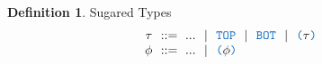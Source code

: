 \documentclass[acmsmall]{acmart}
\theoremstyle{definition}
\newtheorem{definition}{Definition}[section]
\begin{document}
\begin{definition} Sugared Types 
  \label{definition:sugared_types}
  \[\begin{array}[t]{r@{}l}
    \nonterm{\tau} & \is 
    \begin{array}[t]{@{}l}
      ... \sep
      \obj{TOP} \sep 
      \obj{BOT} \sep
      \obj{(}\tau\obj{)}

    \end{array}
    \\
    \nonterm{\phi} & \is 
    \begin{array}[t]{@{}l}
      ... \sep
      \obj{(}\phi\obj{)}

    \end{array}
  \end{array}\]
\end{definition}
\end{document}
